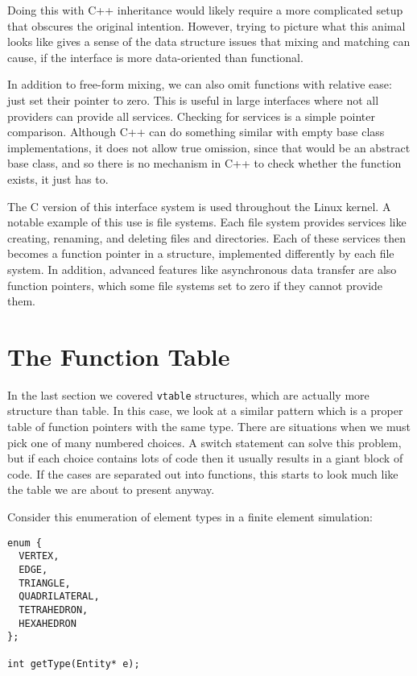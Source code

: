 \documentclass{article}
\begin{document}
Doing this with C++ inheritance would likely require a more complicated
setup that obscures the original intention.
However, trying to picture what this animal looks like gives a sense of
the data structure issues that mixing and matching can cause, if the
interface is more data-oriented than functional.

In addition to free-form mixing, we can also omit functions with relative
ease: just set their pointer to zero.
This is useful in large interfaces where not all providers can provide
all services.
Checking for services is a simple pointer comparison.
Although C++ can do something similar with empty base class implementations,
it does not allow true omission, since that would be an abstract base class,
and so there is no mechanism in C++ to check whether the function exists,
it just has to.

The C version of this interface system is used throughout the Linux kernel.
A notable example of this use is file systems.
Each file system provides services like creating, renaming, and deleting
files and directories.
Each of these services then becomes a function pointer in a structure,
implemented differently by each file system.
In addition, advanced features like asynchronous data transfer are
also function pointers, which some file systems set to zero if they
cannot provide them.

\section{The Function Table}

In the last section we covered \verb+vtable+ structures, which are actually
more structure than table.
In this case, we look at a similar pattern which is a proper table of
function pointers with the same type.
There are situations when we must pick one of many numbered choices.
A switch statement can solve this problem, but if each choice contains
lots of code then it usually results in a giant block of code.
If the cases are separated out into functions, this starts to look much
like the table we are about to present anyway.

Consider this enumeration of element types in a finite element simulation:

\begin{lstlisting}
enum {
  VERTEX,
  EDGE,
  TRIANGLE,
  QUADRILATERAL,
  TETRAHEDRON,
  HEXAHEDRON
};

int getType(Entity* e);
\end{lstlisting}
\end{document}
